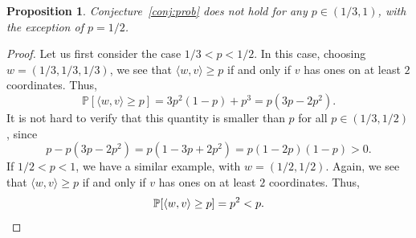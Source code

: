 \documentclass[10pt,a4paper]{amsart}
\newtheorem{proposition}{Proposition}
\def\Pb{\mathbb{P}}
\begin{document}
\begin{proposition}\label{prop:counterexample}
Conjecture~\ref{conj:prob} does not hold for any $p\in (1/3, 1)$, with the exception of $p=1/2$. 
\end{proposition}

\begin{proof}
Let us first consider the case $1/3<p<1/2$. In this case, choosing $w=(1/3, 1/3, 1/3)$, we see that $\langle w, v\rangle\geq p$ if and only if $v$ has ones on at least $2$ coordinates. Thus,
\[\Pb[\langle w, v\rangle\geq p]=3p^2(1-p)+p^3=p(3p-2p^2).\]
It is not hard to verify that this quantity is smaller than $p$ for all $p\in (1/3, 1/2)$, since 
\[p-p(3p-2p^2)=p(1-3p+2p^2)=p(1-2p)(1-p)>0.\]
If $1/2<p<1$, we have a similar example, with $w=(1/2, 1/2)$. Again, we see that $\langle w, v\rangle\geq p$ if and only if $v$ has ones on at least $2$ coordinates. Thus,
\[\Pb[\langle w, v\rangle\geq p]=p^2<p.\qedhere\]
\end{proof}
\end{document}
